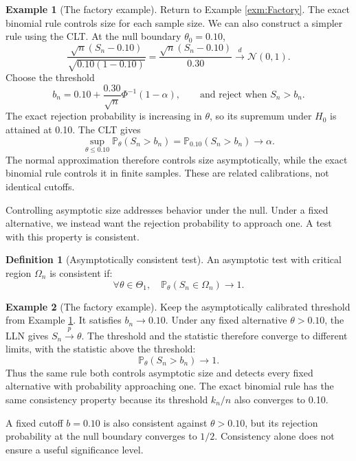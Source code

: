 \documentclass[
  11pt,
]{book}
\theoremstyle{definition}
\newtheorem{definition}{Definition}[chapter]
\theoremstyle{definition}
\newtheorem{example}{Example}[chapter]
\theoremstyle{definition}
\theoremstyle{definition}
\theoremstyle{remark}
\begin{document}
\begin{example}[The factory example]
\protect\hypertarget{exm:FactAsymptlevel}{}\label{exm:FactAsymptlevel}Return to Example \ref{exm:Factory}. The exact binomial rule controls size for each sample size. We can also construct a simpler rule using the CLT. At the null boundary \(\theta_0=0.10\),
\[
\frac{\sqrt{n}(S_n-0.10)}{\sqrt{0.10(1-0.10)}}
=\frac{\sqrt{n}(S_n-0.10)}{0.30}\overset{d}{\longrightarrow}\mathcal{N}(0,1).
\]
Choose the threshold
\[
b_n=0.10+\frac{0.30}{\sqrt{n}}\Phi^{-1}(1-\alpha),
\qquad\text{and reject when }S_n>b_n.
\]
The exact rejection probability is increasing in \(\theta\), so its supremum under \(H_0\) is attained at 0.10. The CLT gives
\[
\sup_{\theta\leq0.10}\mathbb{P}_\theta(S_n>b_n)
=\mathbb{P}_{0.10}(S_n>b_n)\longrightarrow\alpha.
\]
The normal approximation therefore controls size asymptotically, while the exact binomial rule controls it in finite samples. These are related calibrations, not identical cutoffs.
\end{example}

Controlling asymptotic size addresses behavior under the null. Under a fixed alternative, we instead want the rejection probability to approach one. A test with this property is consistent.

\begin{definition}[Asymptotically consistent test]
\protect\hypertarget{def:asmyptconsisttest}{}\label{def:asmyptconsisttest}An asymptotic test with critical region \(\Omega_n\) is consistent if:
\[
\forall \theta \in \Theta_1, \quad \mathbb{P}_\theta (S_n \in \Omega_n) \rightarrow 1.
\]
\end{definition}

\begin{example}[The factory example]
\protect\hypertarget{exm:FactAsymptConsist}{}\label{exm:FactAsymptConsist}Keep the asymptotically calibrated threshold from Example \ref{exm:FactAsymptlevel}. It satisfies \(b_n\to0.10\). Under any fixed alternative \(\theta>0.10\), the LLN gives \(S_n\overset{p}{\to}\theta\). The threshold and the statistic therefore converge to different limits, with the statistic above the threshold:
\[
\mathbb{P}_\theta(S_n>b_n)\longrightarrow1.
\]
Thus the same rule both controls asymptotic size and detects every fixed alternative with probability approaching one. The exact binomial rule has the same consistency property because its threshold \(k_n/n\) also converges to 0.10.

A fixed cutoff \(b=0.10\) is also consistent against \(\theta>0.10\), but its rejection probability at the null boundary converges to \(1/2\). Consistency alone does not ensure a useful significance level.
\end{example}
\end{document}
